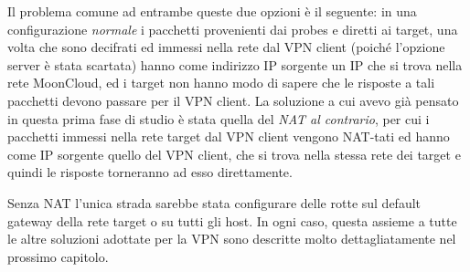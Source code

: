 Il problema comune ad entrambe queste due opzioni è il seguente: in una configurazione
\textit{normale} i pacchetti provenienti dai probes e diretti ai target, una volta che
sono decifrati ed immessi nella rete dal VPN client (poiché l'opzione server
è stata scartata) hanno come indirizzo IP sorgente un IP che si trova nella rete MoonCloud,
ed i target non hanno modo di sapere che le risposte a tali pacchetti devono passare
per il VPN client. La soluzione a cui avevo già pensato in questa prima fase di studio
è stata quella del \textit{NAT al contrario}, per cui i pacchetti immessi nella rete
target dal VPN client vengono NAT-tati ed hanno come IP sorgente quello del VPN
client, che si trova nella stessa rete dei target e quindi le risposte torneranno
ad esso direttamente.

Senza NAT l'unica strada sarebbe stata configurare delle rotte sul default gateway
della rete target o su tutti gli host. In ogni caso, questa assieme a tutte
le altre soluzioni adottate per la VPN sono descritte molto dettagliatamente
nel prossimo capitolo.




